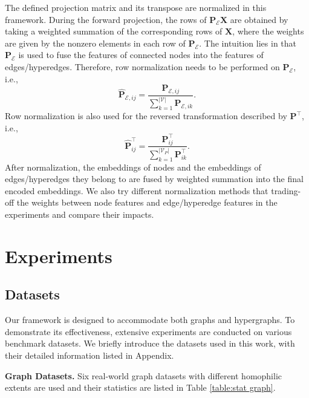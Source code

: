 \documentclass[review]{elsarticle}
\begin{document}
The defined projection matrix and its transpose are normalized in this framework. During the forward projection, the rows of $\mathbf{P}_\mathcal{E}\mathbf{X}$ are obtained by taking a weighted summation of the corresponding rows of $\mathbf{X}$, where the weights are given by the nonzero elements in each row of $\mathbf{P}_\mathcal{E}$. The intuition lies in that $\mathbf{P}_\mathcal{E}$ is used to fuse the features of connected nodes into the features of edges/hyperedges. Therefore, row normalization needs to be performed on $\mathbf{P}_\mathcal{E}$, i.e.,
\begin{equation}
\hat{\mathbf{P}}_{\mathcal{E},ij}=\frac{\mathbf{P}_{\mathcal{E},ij}}{\sum^{|\mathcal{V}|}_{k=1}\mathbf{P}_{\mathcal{E},ik}}.
\end{equation}
Row normalization is also used for the reversed transformation described by $\mathbf{P}^\top$, i.e.,
\begin{equation}
\hat{\mathbf{P}}^{\top}_{ij}=\frac{\mathbf{P}^{\top}_{ij}}{\sum^{|\mathcal{V}_P|}_{k=1}\mathbf{P}^{\top}_{ik}}.
\end{equation}
After normalization, the embeddings of nodes and the embeddings of edges/hyperedges they belong to are fused by weighted summation into the final encoded embeddings. We also try different normalization methods that trading-off the weights between node features and edge/hyperedge features in the experiments and compare their impacts.

\section{Experiments}

\subsection{Datasets}

Our framework is designed to accommodate both graphs and hypergraphs. To demonstrate its effectiveness, extensive experiments are conducted on various benchmark datasets. We briefly introduce the datasets used in this work, with their detailed information listed in Appendix.

\textbf{Graph Datasets.} Six real-world graph datasets with different homophilic extents are used and their statistics are listed in Table \ref{table:stat graph}.
\end{document}
